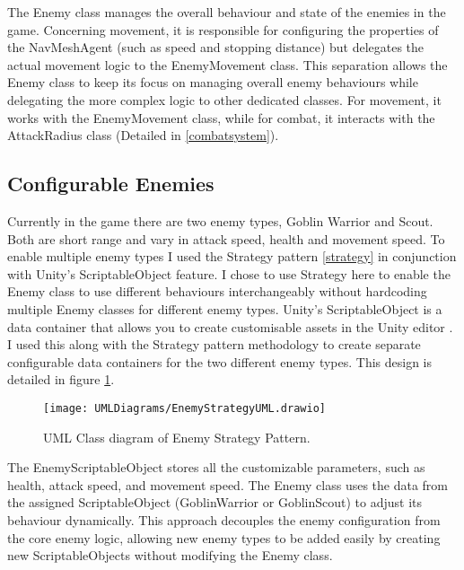 \documentclass[]{final_report}
\begin{document}
The Enemy class manages the overall behaviour and state of the enemies in the game. Concerning movement, it is responsible for configuring the properties of the NavMeshAgent (such as speed and stopping distance) but delegates the actual movement logic to the EnemyMovement class. This separation allows the Enemy class to keep its focus on managing overall enemy behaviours while delegating the more complex logic to other dedicated classes. For movement, it works with the EnemyMovement class, while for combat, it interacts with the AttackRadius class (Detailed in \ref{combatsystem}). 

\subsection{Configurable Enemies}
Currently in the game there are two enemy types, Goblin Warrior and Scout. Both are short range and vary in attack speed, health and movement speed. To enable multiple enemy types I used the Strategy pattern \ref{strategy} in conjunction with Unity's ScriptableObject feature. I chose to use Strategy here to enable the Enemy class to use different behaviours interchangeably without hardcoding multiple Enemy classes for different enemy types. Unity's ScriptableObject is a data container that allows you to create customisable assets in the Unity editor \cite{unity2024_ScriptableObject}. I used this along with the Strategy pattern methodology to create separate configurable data containers for the two different enemy types. This design is detailed in figure \ref{fig:label_strategy}.
\begin{figure}[H]
    \centering
    \texttt{[image: UMLDiagrams/EnemyStrategyUML.drawio]}
    \caption{UML Class diagram of Enemy Strategy Pattern.}
    \label{fig:label_strategy}
\end{figure}
The EnemyScriptableObject stores all the customizable parameters, such as health, attack speed, and movement speed. The Enemy class uses the data from the assigned ScriptableObject (GoblinWarrior or GoblinScout) to adjust its behaviour dynamically. This approach decouples the enemy configuration from the core enemy logic, allowing new enemy types to be added easily by creating new ScriptableObjects without modifying the Enemy class. 
\end{document}
